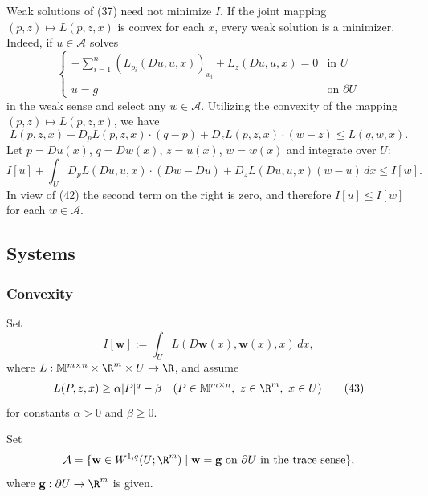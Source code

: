\begin{remark}
\label{rem:weak-solution-minimizer-joint-convexity}
Weak solutions of (37) need not minimize $I$. If the joint mapping $(p,z)\mapsto L(p,z,x)$ is convex for each $x$, every weak solution is a minimizer. Indeed, if $u\in\mathcal A$ solves
\[
\begin{cases}
-\sum_{i=1}^n (L_{p_i}(Du, u, x))_{x_i} + L_z(Du, u, x) = 0 & \text{in } U \\
u = g & \text{on } \partial U
\end{cases}
\tag{42}
\]
in the weak sense and select any $w \in \mathcal{A}$. Utilizing the convexity of the mapping $(p, z) \mapsto L(p, z, x)$, we have
\[
L(p, z, x) + D_p L(p, z, x) \cdot (q - p) + D_z L(p, z, x) \cdot (w - z) \leq L(q, w, x).
\]
Let $p = Du(x)$, $q = Dw(x)$, $z = u(x)$, $w = w(x)$ and integrate over $U$:
\[
I[u] + \int_U D_p L(Du, u, x) \cdot (Dw - Du) + D_z L(Du, u, x)(w - u) \, dx \leq I[w].
\]
In view of (42) the second term on the right is zero, and therefore $I[u] \leq I[w]$ for each $w \in \mathcal{A}$.
\end{remark}

\subsection{Systems}
\label{sec:systems-existence-minimizers}

\subsubsection{Convexity}

Set
\[
I[\mathbf w]:=\int_U L(D\mathbf w(x),\mathbf w(x),x)\,dx,
\]
where $L:\mathbb M^{m\times n}\times\R^m\times U\to\R$, and assume
\[
L(P,z,x)\geq\alpha|P|^q-\beta
\quad(P\in\mathbb M^{m\times n},\ z\in\R^m,\ x\in U)
\tag{43}
\]
for constants $\alpha>0$ and $\beta\geq0$.

\begin{definition}
\label{def:admissible-class-systems}
Set
\[
\mathcal{A} = \{\mathbf{w} \in W^{1,q}(U; \R^m) \mid \mathbf{w} = \mathbf{g} \text{ on } \partial U \text{ in the trace sense}\},
\]
where $\mathbf{g} : \partial U \to \R^m$ is given.
\end{definition}

